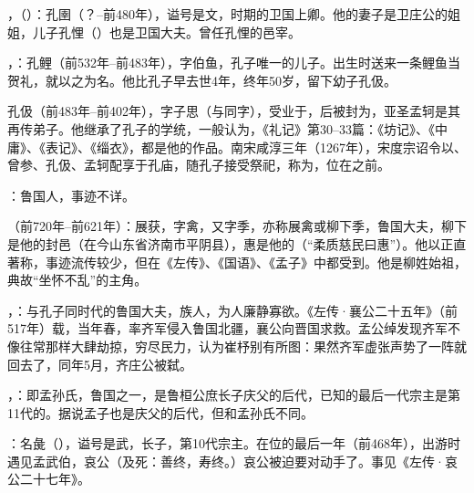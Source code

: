 ，（）：孔圉（？--前480年），谥号是文，时期的卫国上卿。他的妻子是卫庄公的姐姐，儿子孔悝（）也是卫国大夫。曾任孔悝的邑宰。

，：孔鲤（前532年--前483年），字伯鱼，孔子唯一的儿子。出生时送来一条鲤鱼当贺礼，就以之为名。他比孔子早去世4年，终年50岁，留下幼子孔伋。

孔伋（前483年--前402年），字子思（与同字），受业于，后被封为，亚圣孟轲是其再传弟子。他继承了孔子的学统，一般认为，《礼记》第30--33篇：《坊记》、《中庸》、《表记》、《缁衣》，都是他的作品。南宋咸淳三年（1267年），宋度宗诏令以、曾参、孔伋、孟轲配享于孔庙，随孔子接受祭祀，称为，位在之前。

：鲁国人，事迹不详。%

（前720年--前621年）：展获，字禽，又字季，亦称展禽或柳下季，鲁国大夫，柳下是他的封邑（在今山东省济南市平阴县），惠是他的（“柔质慈民曰惠”）。他以正直著称，事迹流传较少，但在《左传》、《国语》、《孟子》中都受到。他是柳姓始祖，典故“坐怀不乱”的主角。

，：与孔子同时代的鲁国大夫，族人，为人廉静寡欲。《左传·襄公二十五年》（前517年）载，当年春，率齐军侵入鲁国北疆，襄公向晋国求救。孟公绰发现齐军不像往常那样大肆劫掠，穷尽民力，认为崔杼别有所图：果然齐军虚张声势了一阵就回去了，同年5月，齐庄公被弑。

，：即孟孙氏，鲁国之一，是鲁桓公庶长子庆父的后代，已知的最后一代宗主是第11代的。据说孟子也是庆父的后代，但和孟孙氏不同。

：名彘（），谥号是武，长子，第10代宗主。在位的最后一年（前468年），出游时遇见孟武伯，哀公（及死：善终，寿终。）哀公被迫要对动手了。事见《左传·哀公二十七年》。

